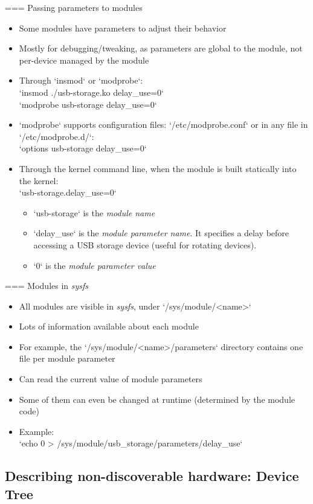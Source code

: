 === {Passing parameters to modules}
  \small
  \begin{itemize}
  \item Some modules have parameters to adjust their behavior
  \item Mostly for debugging/tweaking, as parameters are global to the
    module, not per-device managed by the module
  \item Through `insmod` or `modprobe`:\\
    `insmod ./usb-storage.ko delay_use=0`\\
    `modprobe usb-storage delay_use=0`
  \item `modprobe` supports configuration files: `/etc/modprobe.conf` or in any file in `/etc/modprobe.d/`:\\
    `options usb-storage delay_use=0`
  \item Through the kernel command line, when the module is built statically into the kernel:\\
    `usb-storage.delay_use=0`
    \begin{itemize}
    \item `usb-storage` is the {\em module name}
    \item `delay_use` is the {\em module parameter name}. It
      specifies a delay before accessing a USB storage device (useful for
      rotating devices).
    \item `0` is the {\em module parameter value}
    \end{itemize}
  \end{itemize}


=== {Modules in {\em sysfs}}
  \begin{itemize}
  \item All modules are visible in {\em sysfs}, under `/sys/module/<name>`
  \item Lots of information available about each module
  \item For example, the `/sys/module/<name>/parameters`
    directory contains one file per module parameter
  \item Can read the current value of module parameters
  \item Some of them can even be changed at runtime (determined by the
    module code)
  \item Example:\\
    `echo 0 > /sys/module/usb_storage/parameters/delay_use`
  \end{itemize}


\subsection{Describing non-discoverable hardware: Device Tree}

